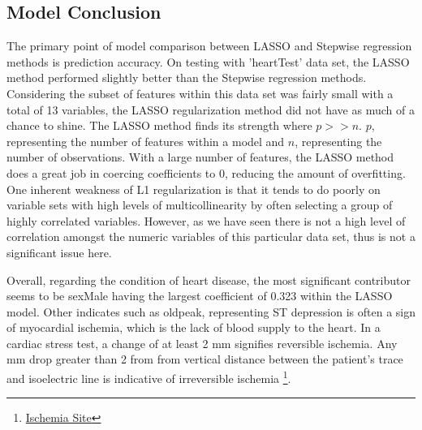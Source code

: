 \documentclass[12pt]{article}
\begin{document}
\subsection{Model Conclusion}
The primary point of model comparison between LASSO and Stepwise regression methods is prediction accuracy. On testing with 'heartTest' data set, the LASSO method performed slightly better than the Stepwise regression methods. Considering the subset of features within this data set was fairly small with a total of 13 variables, the LASSO regularization method did not have as much of a chance to shine. The LASSO method finds its strength where $p>>n$. $p$, representing the number of features within a model and $n$, representing the number of observations. 
  With a large number of features, the LASSO method does a great job in coercing coefficients to 0, reducing the amount of overfitting. One inherent weakness of L1 regularization is that it tends to do poorly on variable sets with high levels of multicollinearity by often selecting a group of highly correlated variables. However, as we have seen there is not a high level of correlation amongst the numeric variables of this particular data set, thus is not a significant issue here. 

  Overall, regarding the condition of heart disease, the most significant contributor seems to be sexMale having the largest coefficient of 0.323 within the LASSO model. Other indicates such as oldpeak, representing ST depression is often a sign of myocardial ischemia, which is the lack of blood supply to the heart. In a cardiac stress test, a change of at least 2 mm signifies reversible ischemia. Any mm drop greater than 2 from from vertical distance between the patient's trace and isoelectric line is indicative of irreversible ischemia \footnote{\href{http://www.madsci.com/manu/ekg_st-t.htm}{Ischemia Site}}. 
\end{document}
